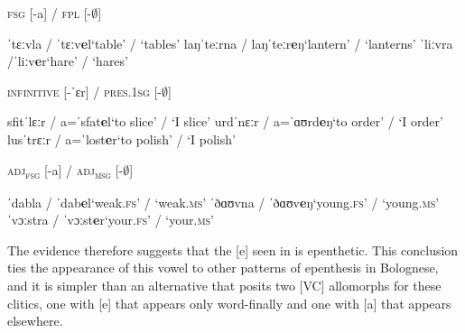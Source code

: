 \documentclass[output=paper,colorlinks,citecolor=brown]{langscibook}
\begin{document}
\begin{exe}
    \ex \label{sonorityepenthesis}
        \begin{xlist}
            \ex \textsc{fsg} [-a] / \textsc{fpl} [-$\emptyset$]
                \begin{xlisti}
                    \ex ˈtɛːvla / ˈtɛːv\textbf{e}l\tab `table' / `tables'
                    \ex laŋˈteːrna / laŋˈteːr\textbf{e}ŋ\tab `lantern' / `lanterns'
                    \ex ˈliːvra /ˈliːv\textbf{e}r\tab `hare' / `hares'
                \end{xlisti}
            \ex \textsc{infinitive} [-ˈɛr] / \textsc{pres.1sg} [-$\emptyset$]
                \begin{xlisti}
                    \ex sfitˈlɛːr / a=ˈsfat\textbf{e}l\tab `to slice' / `I slice'
                    \ex urdˈnɛːr / a=ˈɑʊrd\textbf{e}ŋ\tab `to order' / `I order'
                    \ex lusˈtrɛːr / a=ˈlost\textbf{e}r\tab `to polish' / `I polish'
                \end{xlisti}
\newpage
            \ex \textsc{adj\textsubscript{fsg}} [-a] / \textsc{adj\textsubscript{msg}} [-$\emptyset$]
                \begin{xlisti}
                    \ex ˈdabla / ˈdab\textbf{e}l\tab `weak.\textsc{fs}' / `weak.\textsc{ms}'
                    \ex ˈðɑʊvna / ˈðɑʊv\textbf{e}ŋ\tab `young.\textsc{fs}' / `young.\textsc{ms}'
                    \ex ˈvɔːstra / ˈvɔːst\textbf{e}r\tab `your.\textsc{fs}' / `your.\textsc{ms}'
                \end{xlisti}
        \end{xlist}
\end{exe}



The evidence therefore suggests that the [e] seen in  is epenthetic.  This conclusion ties the appearance of this vowel to other patterns of epenthesis in Bolognese, and it is simpler than an alternative that posits two [VC] allomorphs for these clitics, one with [e] that appears only word-finally and one with [a] that appears elsewhere.
\end{document}
